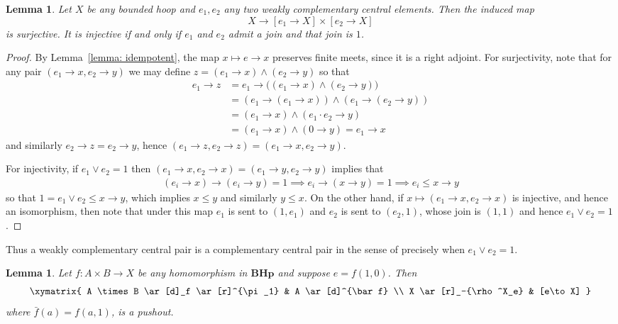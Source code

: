 \documentclass[11pt]{article}
\theoremstyle{pretty}
\newtheorem{lemma}[theorem]{Lemma}
\theoremstyle{plainnote}
\renewcommand{\2}{\mathbf{2}}
\newcommand{\BoundedHoop}{\mathbf{BHp}}
\begin{document}
\begin{lemma} \label{lemma: weakly complementary central}
Let $X$ be any bounded hoop and $e_1, e_2$ any two weakly complementary central elements. Then the induced map 
\[
X \to [e_1 \to X] \times [e_2 \to X]
\]
is surjective. It is injective if and only if $e_1$ and $e_2$ admit a join and that join is $1$.
\end{lemma}
\begin{proof}
By Lemma~\ref{lemma: idempotent}, the map $x \mapsto e\to x$ preserves finite meets, since it is a right adjoint.
For surjectivity, note that for any pair $(e_1 \to x, e_2 \to y)$ we may define $z = (e_1 \to x) \wedge (e_2 \to y)$ so that 
\begin{align*}
    e_1 \to z &= e_1 \to \big ((e_1 \to x) \wedge (e_2 \to y)\big) \\ 
    &= (e_1 \to (e_1 \to x))\wedge (e_1 \to (e_2 \to y)) \\
    &= (e_1 \to x) \wedge (e_1\cdot e_2 \to y) \\
    &= (e_1 \to x) \wedge (0 \to y) = e_1 \to x
\end{align*}
and similarly $e_2 \to z = e_2 \to y$, hence $(e_1 \to z, e_2 \to z) = (e_1 \to x, e_2 \to y)$. 

For injectivity, if $e_1 \vee e_2 = 1$ then $(e_1 \to x, e_2 \to x) = (e_1 \to y, e_2 \to y)$ implies that 
\begin{align*}
(e_i \to x) \to (e_i \to y) = 1 \implies e_i \to (x \to y) = 1 \implies e_i \leqslant x \to y
\end{align*}
so that $1 = e_1 \vee e_2 \leqslant x \to y$, which implies $x \leqslant y$ and similarly $y \leqslant x$. On the other hand, if $x \mapsto (e_1 \to x, e_2 \to x)$ is injective, and hence an isomorphism, then note that under this map $e_1$ is sent to $(1, e_1)$ and $e_2$ is sent to $(e_2, 1)$, whose join is $(1,1)$ and hence $e_1 \vee e_2 = 1$. 
\end{proof}

Thus a weakly complementary central pair is a complementary central pair
in the sense of \cite{Botero2021} precisely when $e_1\vee e_2=1$.

\begin{lemma} \label{lemma: idempotent pushout}
Let $f \colon A \times B \to X$ be any homomorphism in $\BoundedHoop$ and suppose $e = f(1,0)$. Then
\[
\xymatrix{
A \times B \ar[d]_f \ar[r]^{\pi_1} & A \ar[d]^{\bar f} \\
X \ar[r]_-{\rho^X_e} & [e\to X]
}
\]
where $\bar f(a)=f(a,1)$, is a pushout.
\end{lemma}
\end{document}
